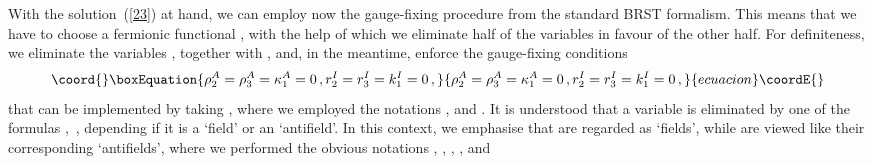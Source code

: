 \documentclass[a4paper,10pt]{article}
\begin{document}
With the solution~(\ref{23}) at hand, we can employ now the gauge-fixing
procedure from the standard BRST formalism. This means that we have to
choose a fermionic functional \coordHE{}, with the help of which we
eliminate half of the variables in favour of the other half. For
definiteness, we eliminate the variables
\coordHE{}, together with \coordHE{}, and, in the meantime,
enforce the gauge-fixing conditions 
\begin{equation}\coord{}\boxEquation{
\label{sp3.134}
\rho _{2}^{A}=\rho _{3}^{A}=\kappa
_{1}^{A}=0\,, r_{2}^{I}=r_{3}^{I}=k_{1}^{I}=0\,,
}{
\rho _{2}^{A}=\rho _{3}^{A}=\kappa
_{1}^{A}=0\,, r_{2}^{I}=r_{3}^{I}=k_{1}^{I}=0\,,
}{ecuacion}\coordE{}\end{equation}
that can be implemented by taking \coordHE{}, where
we employed the notations \coordHE{}, \coordHE{} and \coordHE{}. It is understood that a variable is eliminated
by one of the formulas \coordHE{},\ \coordHE{}, depending if it
is a `field' or an `antifield'. In this context, we emphasise that \coordHE{} are regarded as `fields', while \coordHE{} are viewed like their corresponding `antifields', where
we performed the obvious notations \coordHE{}, \coordHE{}, \coordHE{}, \coordHE{}, and
\end{document}
